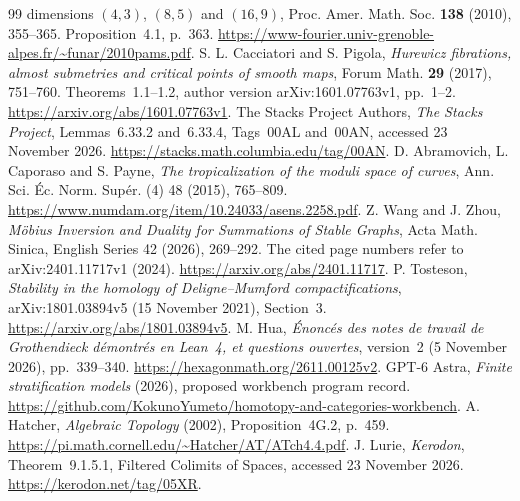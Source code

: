 \documentclass[11pt,a4paper]{article}
\theoremstyle{definition}
\newcommand{\workbenchurl}{https://github.com/KokunoYumeto/homotopy-and-categories-workbench}
\begin{document}
\begin{thebibliography}{99}
{dimensions $(4,3)$, $(8,5)$ and $(16,9)$}, Proc. Amer. Math. Soc.
\textbf{138} (2010), 355--365. Proposition~4.1, p.~363.
\url{https://www-fourier.univ-grenoble-alpes.fr/~funar/2010pams.pdf}.
 S. L. Cacciatori and S. Pigola,
\emph{Hurewicz fibrations, almost submetries and critical points of
smooth maps}, Forum Math. \textbf{29} (2017), 751--760.
Theorems~1.1--1.2, author version arXiv:1601.07763v1, pp.~1--2.
\url{https://arxiv.org/abs/1601.07763v1}.
 The Stacks Project Authors, \emph{The Stacks Project}, Lemmas~6.33.2 and~6.33.4, Tags~00AL and~00AN, accessed 23 November 2026. \url{https://stacks.math.columbia.edu/tag/00AN}.
 D. Abramovich, L. Caporaso and S. Payne, \emph{The tropicalization of the moduli space of curves}, Ann. Sci. \'Ec. Norm. Sup\'er. (4) 48 (2015), 765--809. \url{https://www.numdam.org/item/10.24033/asens.2258.pdf}.
 Z. Wang and J. Zhou, \emph{M\"obius Inversion and Duality for Summations of Stable Graphs}, Acta Math. Sinica, English Series 42 (2026), 269--292. The cited page numbers refer to arXiv:2401.11717v1 (2024). \url{https://arxiv.org/abs/2401.11717}.
 P. Tosteson, \emph{Stability in the homology of Deligne--Mumford compactifications}, arXiv:1801.03894v5 (15 November 2021), Section~3. \url{https://arxiv.org/abs/1801.03894v5}.
 M. Hua, \emph{\'Enonc\'es des notes de travail de Grothendieck d\'emontr\'es en Lean~4, et questions ouvertes}, version~2 (5 November 2026), pp.~339--340. \url{https://hexagonmath.org/2611.00125v2}.
 GPT-6 Astra, \emph{Finite stratification models} (2026), proposed workbench program record. \url{\workbenchurl}.
 A. Hatcher, \emph{Algebraic Topology} (2002), Proposition~4G.2, p.~459. \url{https://pi.math.cornell.edu/~Hatcher/AT/ATch4.4.pdf}.
 J. Lurie, \emph{Kerodon}, Theorem~9.1.5.1, Filtered Colimits of Spaces, accessed 23 November 2026. \url{https://kerodon.net/tag/05XR}.
\end{thebibliography}
\end{document}
